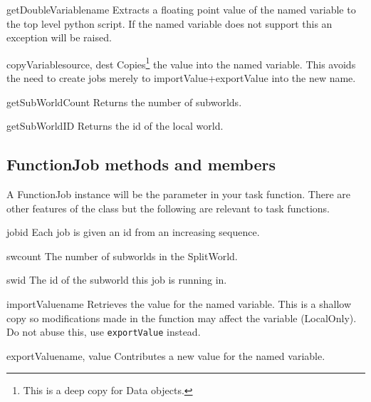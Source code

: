 \begin{methoddesc}[SplitWorld]{getDoubleVariable}{name}
Extracts a floating point value of the named variable to the top level python script.
If the named variable does not support this an exception will be raised.
\end{methoddesc}

\begin{methoddesc}[SplitWorld]{copyVariable}{source, dest}
Copies\footnote{ This is a deep copy for Data objects.} the value into the named variable.
This avoids the need to create jobs merely to importValue+exportValue into the new name.
\end{methoddesc}

\begin{methoddesc}[SplitWorld]{getSubWorldCount}{}
Returns the number of subworlds.
\end{methoddesc}

\begin{methoddesc}[SplitWorld]{getSubWorldID}{}
Returns the id of the local world.
\end{methoddesc}

\subsection{FunctionJob methods and members}
A FunctionJob instance will be the  parameter in your task function.
There are other features of the class but the following are relevant to task functions.


\begin{memberdesc}[FunctionJob]{jobid}
Each job is given an id from an increasing sequence.
\end{memberdesc}

\begin{memberdesc}[FunctionJob]{swcount}
The number of subworlds in the SplitWorld. 
\end{memberdesc}

\begin{memberdesc}[FunctionJob]{swid}
The id of the subworld this job is running in.
\end{memberdesc}

\begin{methoddesc}[FunctionJob]{importValue}{name}
Retrieves the value for the named variable.
This is a shallow copy so modifications made in the function may affect the variable (LocalOnly). 
Do not abuse this, use \texttt{exportValue} instead.
\end{methoddesc}

\begin{methoddesc}[FunctionJob]{exportValue}{name, value}
Contributes a new value for the named variable.
\end{methoddesc}
